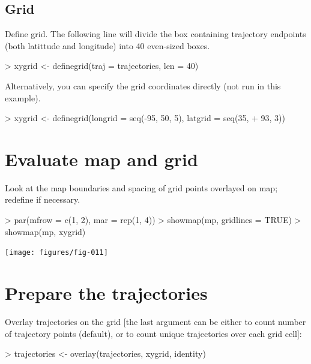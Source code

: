 \documentclass{article}
\renewenvironment{Schunk}{\vspace{\topsep}}{\vspace{\topsep}}
\begin{document}
\subsection{Grid}
Define grid. The following line will divide the box containing trajectory
endpoints (both latittude and longitude) into 40 even-sized boxes.
\begin{Schunk}
\begin{Sinput}
> xygrid <- definegrid(traj = trajectories, len = 40)
\end{Sinput}
\end{Schunk}

Alternatively, you can specify the grid coordinates directly (not run in this example).
\begin{Schunk}
\begin{Sinput}
> xygrid <- definegrid(longrid = seq(-95, 50, 5), latgrid = seq(35, 
+     93, 3))
\end{Sinput}
\end{Schunk}

\section{Evaluate map and grid}


Look at the map boundaries and spacing of grid points overlayed on
map; redefine if necessary. 

\begin{Schunk}
\begin{Sinput}
> par(mfrow = c(1, 2), mar = rep(1, 4))
> showmap(mp, gridlines = TRUE)
> showmap(mp, xygrid)
\end{Sinput}
\end{Schunk}
\texttt{[image: figures/fig-011]}

\section{Prepare the trajectories}


Overlay trajectories on the grid [the last argument can be either
\verb@identity@ to count number of trajectory points (default), or
\verb@unique@ to count unique trajectories over each grid cell]:

\begin{Schunk}
\begin{Sinput}
> trajectories <- overlay(trajectories, xygrid, identity)
\end{Sinput}
\end{Schunk}
\end{document}
